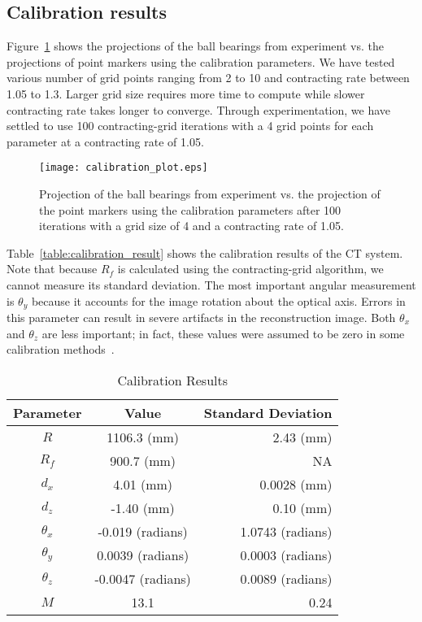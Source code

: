 \subsection{Calibration results}
\label{subsect:cali_results}
Figure~\ref{fig:calibration_plot} shows the projections of the ball bearings from experiment vs. the projections of point markers using the calibration parameters.  We have tested various number of grid points ranging from 2 to 10 and contracting rate between 1.05 to 1.3.  Larger grid size requires more time to compute while slower contracting rate takes longer to converge.  Through experimentation, we have settled to use 100 contracting-grid iterations with a 4 grid points for each parameter at a contracting rate of 1.05.
%
\begin{figure}[h]
\texttt{[image: calibration\_plot.eps]}
\caption{Projection of the ball bearings from experiment vs. the projection of the point markers using the calibration parameters after 100 iterations with a grid size of 4 and a contracting rate of 1.05.}
\label{fig:calibration_plot}
\end{figure}

Table~\ref{table:calibration_result} shows the calibration results of the CT system.  Note that because $R_f$ is calculated using the contracting-grid algorithm, we cannot measure its standard deviation.  The most important angular measurement is $\theta_y$ because it accounts for the image rotation about the optical axis.  Errors in this parameter can result in severe artifacts in the reconstruction image.  Both $\theta_x$ and $\theta_z$ are less important; in fact, these values were assumed to be zero in some calibration methods~\citep{Noo2000, Cho2005, Yang2006}.  
%
\begin{center}
	\begin{table}[ht]\caption{Calibration Results}
		\begin{tabular}{c | c | r}
		\hline
		Parameter &	Value & Standard Deviation \\ \hline \hline
		$R$ & 1106.3 (mm) & 2.43 (mm)\\ \hline
		$R_f$ & 900.7 (mm)&  NA \\ \hline
		$d_x$ & 4.01 (mm)& 0.0028 (mm)\\ \hline
		$d_z$ & -1.40 (mm)& 0.10 (mm)\\ \hline
		$\theta_x$ & -0.019 (radians)& 1.0743 (radians)\\ \hline
		$\theta_y$ & 0.0039 (radians)& 0.0003 (radians)\\ \hline
		$\theta_z$ & -0.0047 (radians)& 0.0089 (radians)\\ \hline	
		$M$ & 13.1 & 0.24 \\ \hline
		\end{tabular}
	\end{table}
	\label{table:calibration_result}
\end{center}

